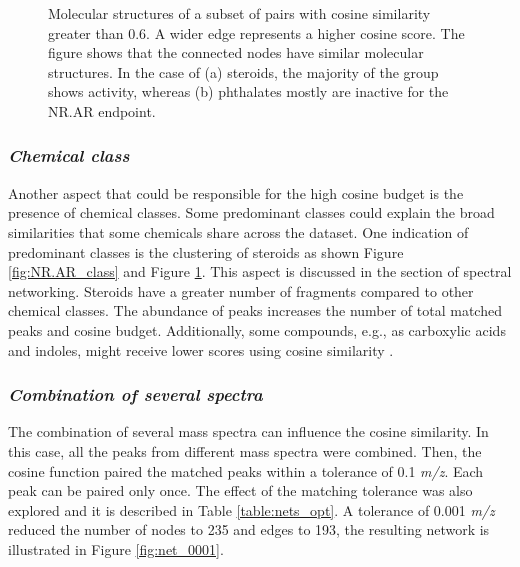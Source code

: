 \begin{figure}
\begin{minipage}[b]{0.8\textwidth}
  \end{minipage}
  \caption{Molecular structures of a subset of pairs with cosine similarity greater than 0.6. A wider edge represents a higher cosine score. The figure shows that the connected nodes have similar molecular structures. In the case of (a) steroids, the majority of the group shows activity, whereas (b) phthalates mostly are inactive for the NR.AR endpoint.}
  \label{fig:net_structures}
\end{figure}


\subsubsection*{\textit{Chemical class}}

Another aspect that could be responsible for the high cosine budget is the presence of chemical classes. Some predominant classes could explain the broad similarities that some chemicals share across the dataset. One indication of predominant classes is the clustering of steroids as shown Figure \ref{fig:NR.AR_class} and Figure \ref{fig:net_structures}. This aspect is discussed in the section of spectral networking. Steroids have a greater number of fragments compared to other chemical classes. The abundance of peaks increases the number of total matched peaks and cosine budget. Additionally, some compounds, e.g., as carboxylic acids and indoles, might receive lower scores using cosine similarity \cite{bittremieux_comparison_2022}. 




\subsubsection*{\textit{Combination of several spectra}}

The combination of several mass spectra can influence the cosine similarity. In this case, all the peaks from different mass spectra were combined. Then, the cosine function paired the matched peaks within a tolerance of 0.1 \textit{m/z}. Each peak can be paired only once. The effect of the matching tolerance was also explored and it is described in Table \ref{table:nets_opt}. A tolerance of  0.001 \textit{m/z} reduced the number of nodes to 235 and edges to 193, the resulting network is illustrated in Figure \ref{fig:net_0001}. 



